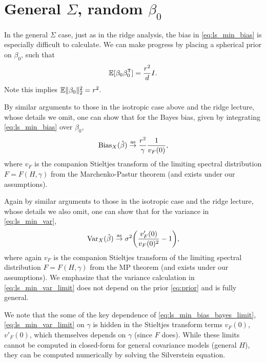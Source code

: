 \documentclass{article}
\begin{document}
\section{General $\Sigma$, random $\beta_0$}

In the general $\Sigma$ case, just as in the ridge analysis, the bias in 
\eqref{eq:ls_min_bias} is especially difficult to calculate. We can make
progress by placing a spherical prior on $\beta_0$, such that        
\begin{equation}
\label{eq:prior}
\mathbb{E}[\beta_0 \beta_0^{\mathsf{T}}] = \frac{r^2}{d} I.
\end{equation}
Note this implies $\mathbb{E} \|\beta_0\|_2^2 = r^2$. 

By similar arguments to those in the isotropic case above and the ridge lecture,
whose details we omit, one can show that for the Bayes bias, given by
integrating \eqref{eq:ls_min_bias} over $\beta_0$,
\begin{equation}
\label{eq:ls_min_bias_bayes_limit}
\mathrm{Bias}_X(\hat{\beta}) \overset{\mathrm{as}}{\to} \frac{r^2}{\gamma} \frac{1}{v_F(0)},  
\end{equation}
where $v_F$ is the companion Stieltjes transform of the limiting spectral
distribution $F = F(H, \gamma)$ from the Marchenko-Pastur theorem (and
 exists under our assumptions).  

Again by similar arguments to those in the isotropic case and the ridge lecture,
whose details we also omit, one can show that for the variance in
\eqref{eq:ls_min_var},  
\begin{equation}
\label{eq:ls_min_var_limit}
\mathrm{Var}_X(\hat{\beta}) \overset{\mathrm{as}}{\to} \sigma^2 \bigg(\frac{v'_F(0)}{v_F(0)^2} - 1 \bigg),
\end{equation}
where again $v_F$ is the companion Stieltjes transform of the limiting spectral 
distribution $F = F(H, \gamma)$ from the MP theorem (and
 exists under our
assumptions). We emphasize that the variance calculation in
\eqref{eq:ls_min_var_limit} does not depend on the prior \eqref{eq:prior} and is
fully general.    

We note that the some of the key dependence of
\eqref{eq:ls_min_bias_bayes_limit}, \eqref{eq:ls_min_var_limit} on $\gamma$ is
hidden in the Stieltjes transform terms $v_F(0)$, $v'_F(0)$, which themselves
depends on $\gamma$ (since $F$ does). While these limits cannot be computed in
closed-form for general covariance models (general $H$), they can be computed
numerically by solving the Silverstein equation.  
\end{document}
